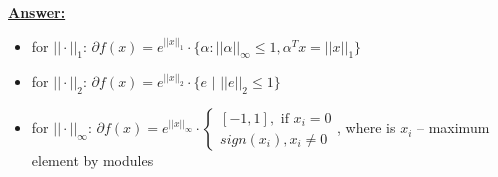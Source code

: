 \underline{\textbf{Answer:}}

\begin{itemize}
    \item for $|| \cdot ||_1$: $\partial f(x) = e^{||x||_1} \cdot \{\alpha : ||\alpha||_{\infty} \leq 1, \alpha^Tx = ||x||_1\}$
    \item for $|| \cdot ||_2$: $\partial f(x) = e^{||x||_2} \cdot \{e \text{ | } ||e||_2 \leq 1 \}$
    \item for $|| \cdot ||_{\infty}$: $\partial f(x) = e^{||x||_{\infty}} \cdot \begin{cases}
            [-1, 1], \text{ if } x_i = 0 \\
            sign(x_i), x_i \not = 0
    \end{cases}$, where is $x_i$ -- maximum element by modules
\end{itemize}


